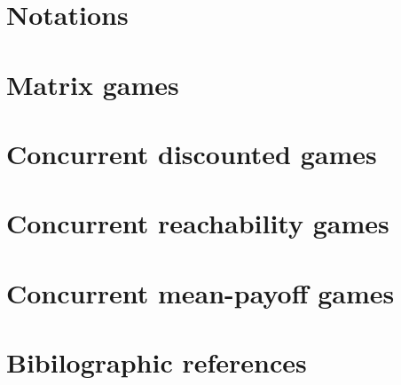 \section{Notations}
\label{7-sec:notations}


\section{Matrix games}
\label{7-sec:matrix_games}


\section{Concurrent discounted games}
\label{7-sec:discounted}


\section{Concurrent reachability games}
\label{7-sec:reachability}


\section{Concurrent mean-payoff games}
\label{7-sec:mean_payoff}


\section*{Bibilographic references}
\label{7-sec:references}









